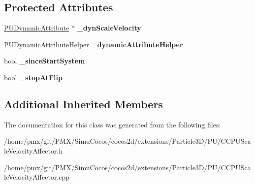 \subsection*{Protected Attributes}
\begin{DoxyCompactItemize}
\item 
\mbox{\label{classPUScaleVelocityAffector_aeb169064b232a53187bfd24fd016c45b}} 
\hyperlink{classPUDynamicAttribute}{P\+U\+Dynamic\+Attribute} $\ast$ {\bfseries \+\_\+dyn\+Scale\+Velocity}
\item 
\mbox{\label{classPUScaleVelocityAffector_a441edf0b6e7e6d9e39d92a8f41f9350c}} 
\hyperlink{classPUDynamicAttributeHelper}{P\+U\+Dynamic\+Attribute\+Helper} {\bfseries \+\_\+dynamic\+Attribute\+Helper}
\item 
\mbox{\label{classPUScaleVelocityAffector_a1231c7f3e2c901b1dbccf6f81db63153}} 
bool {\bfseries \+\_\+since\+Start\+System}
\item 
\mbox{\label{classPUScaleVelocityAffector_a8ba4ca3d4aab2f0ac33dcf0dd662a941}} 
bool {\bfseries \+\_\+stop\+At\+Flip}
\end{DoxyCompactItemize}
\subsection*{Additional Inherited Members}


The documentation for this class was generated from the following files\+:\begin{DoxyCompactItemize}
\item 
/home/pmx/git/\+P\+M\+X/\+Simu\+Cocos/cocos2d/extensions/\+Particle3\+D/\+P\+U/C\+C\+P\+U\+Scale\+Velocity\+Affector.\+h\item 
/home/pmx/git/\+P\+M\+X/\+Simu\+Cocos/cocos2d/extensions/\+Particle3\+D/\+P\+U/C\+C\+P\+U\+Scale\+Velocity\+Affector.\+cpp\end{DoxyCompactItemize}
